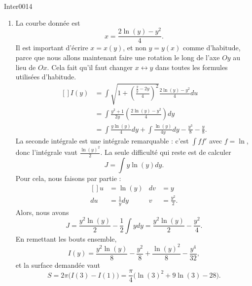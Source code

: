 \begin{corrige}{Inter0014}
\begin{enumerate}
\item
La courbe donnée est
\begin{equation}
	x=\frac{ 2\ln(y)-y^2 }{ 4 }.
\end{equation}
Il est important d'écrire $x=x(y)$, et non $y=y(x)$ comme d'habitude, parce que nous allons maintenant faire une rotation le long de l'axe $Oy$ au lieu de $Ox$. Cela fait qu'il faut changer $x\leftrightarrow y$ dans toutes les formules utilisées d'habitude.
\begin{equation}
	\begin{aligned}[]
		I(y)	&=\int\sqrt{1+\left( \frac{ \frac{ 2 }{ y }-2y }{ 4 } \right)^2}\frac{ 2\ln(y)-y^2 }{ 4 }du\\
			&=\int \frac{ y^2+1 }{ 2y }\left(  \frac{ 2\ln(y)-y^2 }{ 4 }\right)dy\\
			&=\int\frac{ y\ln(y) }{ 4 }dy+\int\frac{ \ln(y) }{ 4y }dy-\frac{ y^3 }{ 8 }-\frac{ y }{ 8 }.
	\end{aligned}
\end{equation}
La seconde intégrale est une intégrale remarquable : c'est $\int ff'$ avec $f=\ln$, donc l'intégrale vaut $\frac{ \ln(y)^2 }{2}$. La seule difficulté qui reste est de calculer
\begin{equation}
	J=\int y\ln(y)dy.
\end{equation}
Pour cela, nous faisons par partie :
\begin{equation}
	\begin{aligned}[]
		u&=\ln(y)		&dv&=y\\
		du&=\frac{1}{ y }dy	&v&=\frac{ y^2 }{ 2 }.
	\end{aligned}
\end{equation}
Alors, nous avons
\begin{equation}
	J=\frac{ y^2\ln(y) }{ 2 }-\frac{ 1 }{2}\int ydy=\frac{ y^2\ln(y) }{ 2 }-\frac{ y^2 }{ 4 }.
\end{equation}
En remettant les bouts ensemble,
\begin{equation}
	I(y)=\frac{ y^2\ln(y) }{ 8 }-\frac{ y^2 }{ 8 }+\frac{ \ln(y)^2 }{ 8 }-\frac{ y^4 }{ 32 },
\end{equation}
et la surface demandée vaut
\begin{equation}
	S=2\pi\big( I(3)-I(1) \big)=\frac{ \pi }{ 4 }\big( \ln(3)^2+9\ln(3)-28 \big).
\end{equation}
\end{enumerate}


\end{corrige}
